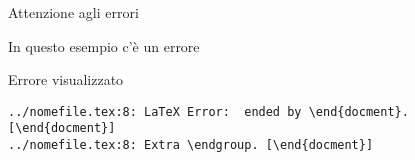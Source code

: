 \begin{frame}[fragile]{Attenzione agli errori}

\begin{exampleblock}{In questo esempio c'è un errore}
	
\end{exampleblock}

\pause

\begin{alertblock}{Errore visualizzato}
	\begin{lstlisting}
../nomefile.tex:8: LaTeX Error:  ended by \end{docment}. [\end{docment}]
../nomefile.tex:8: Extra \endgroup. [\end{docment}]
	\end{lstlisting}
\end{alertblock}

\end{frame}